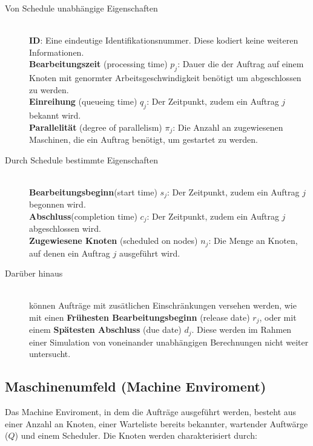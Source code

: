\begin{description}
\item[Von Schedule unabhängige Eigenschaften] \hfil \\
\textbf{ID}: Eine eindeutige Identifikationsnummer. Diese kodiert keine weiteren Informationen.\\
\textbf{Bearbeitungszeit} (processing time) $p_j$: Dauer die der Auftrag auf einem Knoten mit genormter Arbeitsgeschwindigkeit benötigt um abgeschlossen zu werden.\\
\textbf{Einreihung} (queueing time) $q_j$: Der Zeitpunkt, zudem ein Auftrag $j$ bekannt wird.\\
\textbf{Parallelität} (degree of parallelism) $\pi_j$: Die Anzahl an zugewiesenen Maschinen, die ein Auftrag benötigt, um gestartet zu werden.\\
\item[Durch Schedule bestimmte Eigenschaften]\hfill \\ 
\textbf{Bearbeitungsbeginn}(start time) $s_j$: Der Zeitpunkt, zudem ein Auftrag $j$ begonnen wird. \\
\textbf{Abschluss}(completion time) $c_j$: Der Zeitpunkt, zudem ein Auftrag $j$ abgeschlossen wird.\\
\textbf{Zugewiesene Knoten} (scheduled on nodes) $n_j$: Die Menge an Knoten, auf denen ein Auftrag $j$ ausgeführt wird.\\

\item[Darüber hinaus] \hfil \\
können Aufträge mit zusätlichen Einschränkungen versehen werden, wie mit einen \textbf{Frühesten Bearbeitungsbeginn} (release date) $r_j$, oder mit einem \textbf{Spätesten Abschluss} (due date) $d_j$. Diese werden im Rahmen einer Simulation von voneinander unabhängigen Berechnungen nicht weiter untersucht.
\end{description}

\subsection{Maschinenumfeld (Machine Enviroment)}
Das Machine Enviroment, in dem die Aufträge ausgeführt werden, besteht aus einer Anzahl an Knoten, einer Warteliste bereits bekannter, wartender Auftwärge ($Q$) und einem Scheduler. Die Knoten werden charakterisiert durch:

